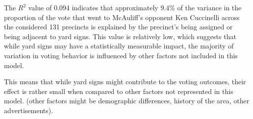 \documentclass[12pt,letterpaper]{article}
\begin{document}
\begin{enumerate}
	The $R^2$ value of 0.094 indicates that approximately 9.4\% of the variance in the proportion of the vote that went to McAuliff's opponent Ken Cuccinelli across the considered 131 precincts is explained by the precinct's being assigned or being adjacent to yard signs. This value is relatively low, which suggests that while yard signs may have a statistically measurable impact, the majority of variation in voting behavior is influenced by other factors not included in this model. 
	
	 This means that while yard signs might contribute to the voting outcomes, their effect is rather small when compared to other factors not represented in this model. (other factors might be demographic differences, history of the area, other advertisements).
	
\end{enumerate}  
\end{document}
